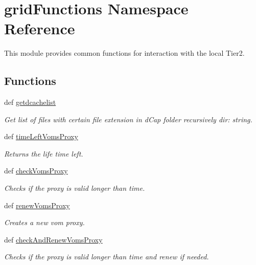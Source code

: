 \section{grid\-Functions Namespace Reference}
\label{namespacegridFunctions}


This module provides common functions for interaction with the local Tier2.  


\subsection*{Functions}
\begin{DoxyCompactItemize}
\item 
def \hyperlink{namespacegridFunctions_a4e79293482a3e6c550544cbb604b31a2}{getdcachelist}
\begin{DoxyCompactList}\small\item\em Get list of files with certain file extension in d\-Cap folder recursively  dir\-: string. \end{DoxyCompactList}\item 
def \hyperlink{namespacegridFunctions_afcaaf26f40337917700fdbba5358c40a}{time\-Left\-Voms\-Proxy}
\begin{DoxyCompactList}\small\item\em Returns the life time left. \end{DoxyCompactList}\item 
def \hyperlink{namespacegridFunctions_a6e867b80786f4b466ec8438cab40603c}{check\-Voms\-Proxy}
\begin{DoxyCompactList}\small\item\em Checks if the proxy is valid longer than time. \end{DoxyCompactList}\item 
def \hyperlink{namespacegridFunctions_a52fea718b08534d76e61a53dd43e2402}{renew\-Voms\-Proxy}
\begin{DoxyCompactList}\small\item\em Creates a new vom proxy. \end{DoxyCompactList}\item 
def \hyperlink{namespacegridFunctions_a62e5066cf1057859a9b43a8c88066960}{check\-And\-Renew\-Voms\-Proxy}
\begin{DoxyCompactList}\small\item\em Checks if the proxy is valid longer than time and renew if needed. \end{DoxyCompactList}\end{DoxyCompactItemize}


